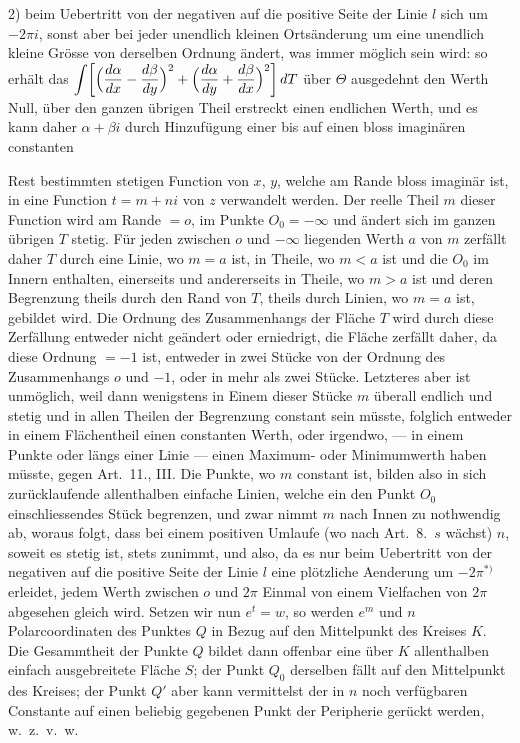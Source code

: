 \documentclass{article}
\begin{document}
2) beim Uebertritt von der negativen auf die positive Seite der Linie $l$ sich um $-2\pi i$, sonst aber bei jeder unendlich kleinen Ortsänderung um eine unendlich kleine Grösse von derselben Ordnung ändert,
was immer möglich sein wird: so erhält das $\displaystyle\int \biggl[\Bigl(\frac{d\alpha}{dx} - \frac{d\beta}{dy}\Bigr)^2 + \Bigl(\frac{d\alpha}{dy} + \frac{d\beta}{dx}\Bigr)^2\biggr]\,dT$ über $\varTheta$ ausgedehnt den Werth Null, über den ganzen übrigen Theil erstreckt einen endlichen Werth, und es kann daher $\alpha + \beta i$ durch Hinzufügung einer bis auf einen bloss imaginären constanten

Rest bestimmten stetigen Function von $x$, $y$, welche am Rande bloss imaginär ist, in eine Function $t = m + ni$ von $z$ verwandelt werden. Der reelle Theil $m$ dieser Function wird am Rande $= o$, im Punkte $O_0 = -\infty$ und ändert sich im ganzen übrigen $T$ stetig. Für jeden zwischen $o$ und $-\infty$ liegenden Werth $a$ von $m$ zerfällt daher $T$ durch eine Linie, wo $m = a$ ist, in Theile, wo $m < a$ ist und die $O_0$ im Innern enthalten, einerseits und andererseits in Theile, wo $m > a$ ist und deren Begrenzung theils durch den Rand von $T$, theils durch Linien, wo $m = a$ ist, gebildet wird. Die Ordnung des Zusammenhangs der Fläche $T$ wird durch diese Zerfällung entweder nicht geändert oder erniedrigt, die Fläche zerfällt daher, da diese Ordnung $= -1$ ist, entweder in zwei Stücke von der Ordnung des Zusammenhangs $o$ und $-1$, oder in mehr als zwei Stücke. Letzteres aber ist unmöglich, weil dann wenigstens in Einem dieser Stücke $m$ überall endlich und stetig und in allen Theilen der Begrenzung constant sein müsste, folglich entweder in einem Flächentheil einen constanten Werth, oder irgendwo, --- in einem Punkte oder längs einer Linie --- einen Maximum- oder Minimumwerth haben müsste, gegen Art.~11., III. Die Punkte, wo $m$ constant ist, bilden also in sich zurücklaufende allenthalben einfache Linien, welche ein den Punkt $O_0$ einschliessendes Stück begrenzen, und zwar nimmt $m$ nach Innen zu nothwendig ab, woraus folgt, dass bei einem positiven Umlaufe (wo nach Art.~8.\ $s$ wächst) $n$, soweit es stetig ist, stets zunimmt, und also, da es nur beim Uebertritt von der negativen auf die positive Seite der Linie $l$ eine plötzliche Aenderung um $-2\pi^{*)}$ erleidet, jedem Werth zwischen $o$ und $2\pi$ Einmal von einem Vielfachen von $2\pi$ abgesehen gleich wird. Setzen wir nun $e^t = w$, so werden $e^m$ und $n$ Polarcoordinaten des Punktes $Q$ in Bezug auf den Mittelpunkt des Kreises $K$. Die Gesammtheit der Punkte $Q$ bildet dann offenbar eine über $K$ allenthalben einfach ausgebreitete Fläche $S$; der Punkt $Q_0$ derselben fällt auf den Mittelpunkt des Kreises; der Punkt $Q'$ aber kann vermittelst der in $n$ noch verfügbaren Constante auf einen beliebig gegebenen Punkt der Peripherie gerückt werden, w.\ z.\ v.\ w.
\end{document}
